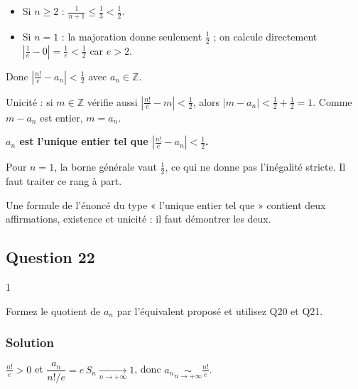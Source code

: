 \documentclass[11pt,a4paper]{article}
\providecommand{\tightlist}{\setlength{\itemsep}{0pt}\setlength{\parskip}{0pt}}
\begin{document}
\begin{itemize}
\tightlist
\item
  Si \(n\ge2\) : \(\frac1{n+1}\le\frac13<\frac12\).
\item
  Si \(n=1\) : la majoration donne seulement \(\frac12\) ; on calcule directement \(\left|\frac1e-0\right|=\frac1e<\frac12\) car \(e>2\).
\end{itemize}

Donc \(\left|\frac{n!}e-a_n\right|<\frac12\) avec \(a_n\in\mathbb Z\).

Unicité : si \(m\in\mathbb Z\) vérifie aussi \(\left|\frac{n!}e-m\right|<\frac12\), alors \(|m-a_n|<\frac12+\frac12=1\). Comme \(m-a_n\) est entier, \(m=a_n\).

\textbf{\(a_n\) est l'unique entier tel que \(\left|\frac{n!}e-a_n\right|<\frac12\).}

\begin{piege}

Pour \(n=1\), la borne générale vaut \(\frac12\), ce qui ne donne pas l'inégalité stricte. Il faut traiter ce rang à part.

\end{piege}

\begin{jury}

Une formule de l'énoncé du type « l'unique entier tel que » contient deux affirmations, existence et unicité : il faut démontrer les deux.

\end{jury}

\hypertarget{question-22}{%
\subsection{Question 22}\label{question-22}}

\begin{indication}{1}

Formez le quotient de \(a_n\) par l'équivalent proposé et utilisez Q20 et Q21.

\end{indication}

\hypertarget{solution-21}{%
\subsubsection{Solution}\label{solution-21}}

\(\frac{n!}e>0\) et \(\dfrac{a_n}{n!/e}=e\,S_n\xrightarrow[n\to+\infty]{}1\), donc \(\boxed{a_n\underset{n\to+\infty}{\sim}\frac{n!}e.}\)
\end{document}

